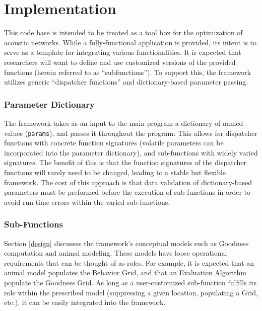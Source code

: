 \chapter{Implementation}
\label{implementation}
This code base is intended to be treated as a tool box for the optimization of acoustic networks.  While a fully-functional application is provided, its intent is to serve as a template for integrating various functionalities.  It is expected that researchers will want to define and use customized versions of the provided functions (herein referred to as ``subfunctions'').  To support this, the framework utilizes generic ``dispatcher functions'' and dictionary-based parameter passing.  

\subsection{Parameter Dictionary}
\label{parameterDictionary}
The framework takes as an input to the main program a dictionary of named values (\texttt{params}), and passes it throughout the program.  This allows for dispatcher functions with concrete function signatures (volatile parameters can be incorporated into the parameter dictionary), and sub-functions with widely varied signatures.  The benefit of this is that the function signatures of the dispatcher functions will rarely need to be changed, leading to a stable but flexible framework. The cost of this approach is that data validation of dictionary-based parameters must be preformed before the execution of sub-functions in order to avoid run-time errors within the varied sub-functions.  


\subsection{Sub-Functions}
\label{sub-functions}
Section \ref{design} discusses the framework's conceptual models such as Goodness computation and animal modeling.  These models have loose operational requirements that can be thought of as roles.  For example, it is expected that an animal model populates the Behavior Grid, and that an Evaluation Algorithm populate the Goodness Grid.  As long as a user-customized sub-function fulfills its role within the prescribed model (suppressing a given location, populating a Grid, etc.), it can be easily integrated into the framework.

